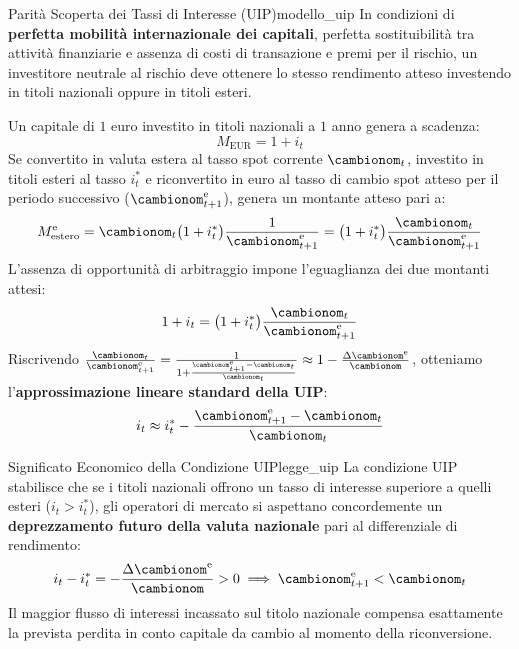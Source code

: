 \begin{modello}{Parità Scoperta dei Tassi di Interesse (UIP)}{modello_uip}
In condizioni di \textbf{perfetta mobilità internazionale dei capitali}, perfetta sostituibilità tra attività finanziarie e assenza di costi di transazione e premi per il rischio, un investitore neutrale al rischio deve ottenere lo stesso rendimento atteso investendo in titoli nazionali oppure in titoli esteri.

Un capitale di $1$ euro investito in titoli nazionali a $1$ anno genera a scadenza:
\begin{equation}
    M_{\text{EUR}} = 1 + i_t
\end{equation}
Se convertito in valuta estera al tasso spot corrente $\cambionom_t$, investito in titoli esteri al tasso $i_t^*$ e riconvertito in euro al tasso di cambio spot atteso per il periodo successivo ($\cambionom_{t+1}^{\mathrm{e}}$), genera un montante atteso pari a:
\begin{equation}
    M_{\text{estero}}^{\mathrm{e}} = \cambionom_t \big( 1 + i_t^* \big) \frac{1}{\cambionom_{t+1}^{\mathrm{e}}} = \big( 1 + i_t^* \big) \frac{\cambionom_t}{\cambionom_{t+1}^{\mathrm{e}}}
\end{equation}
L'assenza di opportunità di arbitraggio impone l'eguaglianza dei due montanti attesi:
\begin{equation}
    1 + i_t = \big( 1 + i_t^* \big) \frac{\cambionom_t}{\cambionom_{t+1}^{\mathrm{e}}} \label{eq:uip_esatta}
\end{equation}
Riscrivendo $\frac{\cambionom_t}{\cambionom_{t+1}^{\mathrm{e}}} = \frac{1}{1 + \frac{\cambionom_{t+1}^{\mathrm{e}} - \cambionom_t}{\cambionom_t}} \approx 1 - \frac{\Delta \cambionom^{\mathrm{e}}}{\cambionom}$, otteniamo l'\textbf{approssimazione lineare standard della UIP}:
\begin{equation}
    i_t \approx i_t^* - \frac{\cambionom_{t+1}^{\mathrm{e}} - \cambionom_t}{\cambionom_t} \label{eq:uip_lineare}
\end{equation}
\end{modello}

\begin{legge}{Significato Economico della Condizione UIP}{legge_uip}
La condizione UIP stabilisce che se i titoli nazionali offrono un tasso di interesse superiore a quelli esteri ($i_t > i_t^*$), gli operatori di mercato si aspettano concordemente un \textbf{deprezzamento futuro della valuta nazionale} pari al differenziale di rendimento:
\begin{equation}
    i_t - i_t^* = -\frac{\Delta \cambionom^{\mathrm{e}}}{\cambionom} > 0 \implies \cambionom_{t+1}^{\mathrm{e}} < \cambionom_t
\end{equation}
Il maggior flusso di interessi incassato sul titolo nazionale compensa esattamente la prevista perdita in conto capitale da cambio al momento della riconversione.
\end{legge}

